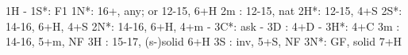 1H - 1S*: F1
1N*: 16+, any; or 12-15, 6+H
2m : 12-15, nat
2H*: 12-15, 4+S
2S*: 14-16, 6+H, 4+S
2N*: 14-16, 6+H, 4+m
   - 3C*: ask
        - 3D : 4+D
        - 3H*: 4+C
3m : 14-16, 5+m, NF
3H : 15-17, (s-)solid 6+H
3S : inv, 5+S, NF
3N*: GF, solid 7+H
